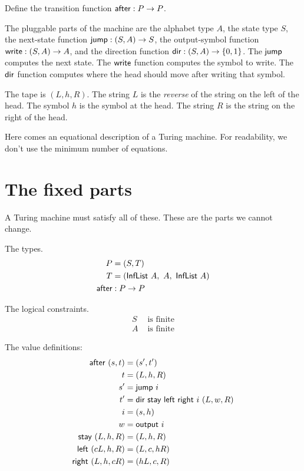 Define the transition function \(\textsf{after} : P \to P\).

The pluggable parts of the machine are
the alphabet type \(A\),
the state type \(S\),
the next-state function \(\textsf{jump} : (S,A) \to S\),
the output-symbol function \(\textsf{write} : (S,A) \to A\),
and the direction function \(\textsf{dir} : (S,A) \to \{0,1\}\).
The \(\textsf{jump}\) computes the next state.
The \(\textsf{write}\) function computes the symbol to write.
The \(\textsf{dir}\) function computes where the head should move after writing that symbol.

The tape is \((L,h,R)\).
The string \(L\) is the \emph{reverse} of the string on the left of the head.
The symbol \(h\) is the symbol at the head.
The string \(R\) is the string on the right of the head.

Here comes an equational description of a Turing machine.
For readability, we don't use the minimum number of equations.

\section{The fixed parts}

A Turing machine must satisfy all of these.
These are the parts we cannot change.

The types.
\begin{align}
    P &= (S,T)
    \\
    T &= (\textsf{InfList}~A, ~ A, ~ \textsf{InfList}~A)
    \\
    \textsf{after} &: P \to P
\end{align}

The logical constraints.
\begin{align}
    S &\text{ is finite}
    \\
    A &\text{ is finite}
\end{align}

The value definitions:
\begin{align}
    \textsf{after}~(s,t) &= (s',t')
    \\
    t &= (L,h,R)
    \\
    s' &= \textsf{jump}~i
    \\
    t' &= \textsf{dir}~\textsf{stay}~\textsf{left}~\textsf{right}~i~(L,w,R)
    \\
    i &= (s,h)
    \\
    w &= \textsf{output}~i
    \\
    \textsf{stay}~(L,h,R) &= (L,h,R)
    \\
    \textsf{left}~(cL,h,R) &= (L,c,hR)
    \\
    \textsf{right}~(L,h,cR) &= (hL,c,R)
\end{align}

